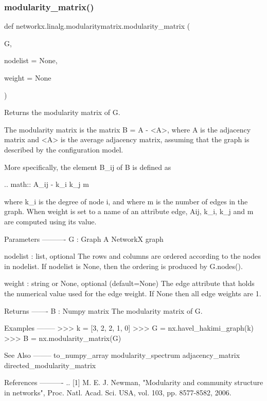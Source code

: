 \subsubsection{\texorpdfstring{modularity\+\_\+matrix()}{modularity\_matrix()}}
{\footnotesize\ttfamily def networkx.\+linalg.\+modularitymatrix.\+modularity\+\_\+matrix (\begin{DoxyParamCaption}\item[{}]{G,  }\item[{}]{nodelist = {\ttfamily None},  }\item[{}]{weight = {\ttfamily None} }\end{DoxyParamCaption})}

\begin{DoxyVerb}Returns the modularity matrix of G.

The modularity matrix is the matrix B = A - <A>, where A is the adjacency
matrix and <A> is the average adjacency matrix, assuming that the graph
is described by the configuration model.

More specifically, the element B_ij of B is defined as

.. math::
    A_{ij} - {k_i k_j  m}

where k_i is the degree of node i, and where m is the number of edges
in the graph. When weight is set to a name of an attribute edge, Aij, k_i,
k_j and m are computed using its value.

Parameters
----------
G : Graph
   A NetworkX graph

nodelist : list, optional
   The rows and columns are ordered according to the nodes in nodelist.
   If nodelist is None, then the ordering is produced by G.nodes().

weight : string or None, optional (default=None)
   The edge attribute that holds the numerical value used for
   the edge weight.  If None then all edge weights are 1.

Returns
-------
B : Numpy matrix
  The modularity matrix of G.

Examples
--------
>>> k = [3, 2, 2, 1, 0]
>>> G = nx.havel_hakimi_graph(k)
>>> B = nx.modularity_matrix(G)


See Also
--------
to_numpy_array
modularity_spectrum
adjacency_matrix
directed_modularity_matrix

References
----------
.. [1] M. E. J. Newman, "Modularity and community structure in networks",
       Proc. Natl. Acad. Sci. USA, vol. 103, pp. 8577-8582, 2006.
\end{DoxyVerb}
 
